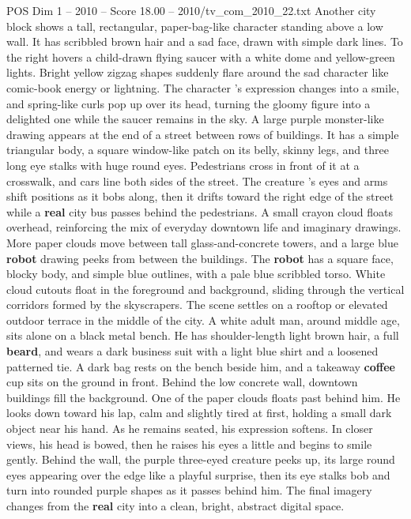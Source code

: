 \begin{textsample}{POS Dim 1 – 2010 – Score 18.00 – 2010/tv\_com\_2010\_22.txt}
Another city block shows a tall, rectangular, paper-bag-like character standing above a low wall.
It has scribbled brown hair and a sad face, drawn with simple dark lines.
To the right hovers a child-drawn flying saucer with a white dome and yellow-green lights.
Bright yellow zigzag shapes suddenly flare around the sad character like comic-book energy or lightning.
The character ’s expression changes into a smile, and spring-like curls pop up over its head, turning the gloomy figure into a delighted one while the saucer remains in the sky.
A large purple monster-like drawing appears at the end of a street between rows of buildings.
It has a simple triangular body, a square window-like patch on its belly, skinny legs, and three long eye stalks with huge round eyes.
Pedestrians cross in front of it at a crosswalk, and cars line both sides of the street.
The creature ’s eyes and arms shift positions as it bobs along, then it drifts toward the right edge of the street while a \textbf{real} city bus passes behind the pedestrians.
A small crayon cloud floats overhead, reinforcing the mix of everyday downtown life and imaginary drawings.
More paper clouds move between tall glass-and-concrete towers, and a large blue \textbf{robot} drawing peeks from between the buildings.
The \textbf{robot} has a square face, blocky body, and simple blue outlines, with a pale blue scribbled torso.
White cloud cutouts float in the foreground and background, sliding through the vertical corridors formed by the skyscrapers.
The scene settles on a rooftop or elevated outdoor terrace in the middle of the city.
A white adult man, around middle age, sits alone on a black metal bench.
He has shoulder-length light brown hair, a full \textbf{beard}, and wears a dark business suit with a light blue shirt and a loosened patterned tie.
A dark bag rests on the bench beside him, and a takeaway \textbf{coffee} cup sits on the ground in front.
Behind the low concrete wall, downtown buildings fill the background.
One of the paper clouds floats past behind him.
He looks down toward his lap, calm and slightly tired at first, holding a small dark object near his hand.
As he remains seated, his expression softens.
In closer views, his head is bowed, then he raises his eyes a little and begins to smile gently.
Behind the wall, the purple three-eyed creature peeks up, its large round eyes appearing over the edge like a playful surprise, then its eye stalks bob and turn into rounded purple shapes as it passes behind him.
The final imagery changes from the \textbf{real} city into a clean, bright, abstract digital space.

\end{textsample}
